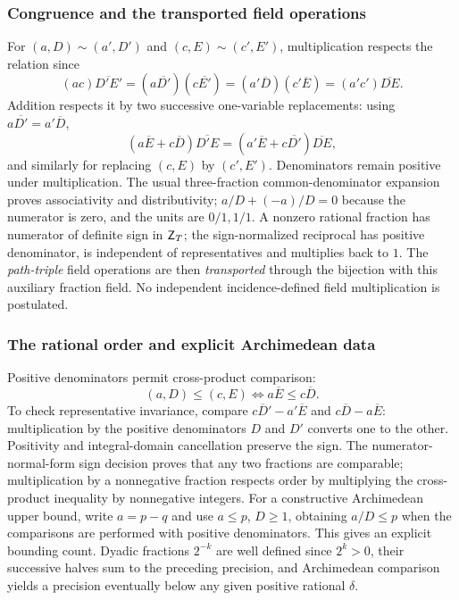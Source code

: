 \documentclass[11pt,reqno]{amsart}
\theoremstyle{definition}\newtheorem{definition}[theorem]{Definition}
\theoremstyle{remark}\newtheorem{remark}[theorem]{Remark}
\begin{document}
\medskip
\subsubsection*{Congruence and the transported field operations}\label{supp:6-4}
For $(a,D)\sim(a',D')$ and $(c,E)\sim(c',E')$, multiplication respects the relation since
\[(ac)\overline{D'E'}=(a\overline{D'})(c\overline{E'})=(a'\overline D)(c'\overline E)=(a'c')\overline{DE}.\]
Addition respects it by two successive one-variable replacements: using $a\overline{D'}=a'\overline D$,
\[(a\overline E+c\overline D)\overline{D'E}=(a'\overline E+c\overline{D'})\overline{DE},\]
and similarly for replacing $(c,E)$ by $(c',E')$. Denominators remain positive under multiplication. The usual three-fraction common-denominator expansion proves associativity and distributivity; $a/D+(-a)/D=0$ because the numerator is zero, and the units are $0/1,1/1$. A nonzero rational fraction has numerator of definite sign in $\mathsf Z_T$; the sign-normalized reciprocal has positive denominator, is independent of representatives and multiplies back to $1$. The \emph{path-triple} field operations are then \emph{transported} through the bijection with this auxiliary fraction field. No independent incidence-defined field multiplication is postulated.
\medskip
\medskip
\subsubsection*{The rational order and explicit Archimedean data}\label{supp:6-5}
Positive denominators permit cross-product comparison:
\[(a,D)\le(c,E)\iff a\overline E\le c\overline D.\]
To check representative invariance, compare $c\overline D'-a'\overline E$ and $c\overline D-a\overline E$: multiplication by the positive denominators $D$ and $D'$ converts one to the other. Positivity and integral-domain cancellation preserve the sign. The numerator-normal-form sign decision proves that any two fractions are comparable; multiplication by a nonnegative fraction respects order by multiplying the cross-product inequality by nonnegative integers. For a constructive Archimedean upper bound, write $a=p-q$ and use $a\le p$, $D\ge1$, obtaining $a/D\le p$ when the comparisons are performed with positive denominators. This gives an explicit bounding count. Dyadic fractions $2^{-k}$ are well defined since $2^k>0$, their successive halves sum to the preceding precision, and Archimedean comparison yields a precision eventually below any given positive rational $\delta$.
\medskip
\end{document}
